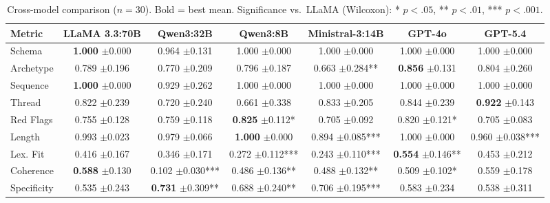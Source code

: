 \begin{table}[t]
\centering
\caption{Cross-model comparison ($n{=}30$). Bold = best mean. Significance vs.\ LLaMA (Wilcoxon): * $p{<}.05$, ** $p{<}.01$, *** $p{<}.001$.}
\label{tab:crossmodel}
\begin{tabular}{lcccccc}
\toprule
Metric & LLaMA 3.3:70B & Qwen3:32B & Qwen3:8B & Ministral-3:14B & GPT-4o & GPT-5.4 \\
\midrule
Schema & \textbf{1.000} {\scriptsize$\pm$0.000} & 0.964 {\scriptsize$\pm$0.131} & 1.000 {\scriptsize$\pm$0.000} & 1.000 {\scriptsize$\pm$0.000} & 1.000 {\scriptsize$\pm$0.000} & 1.000 {\scriptsize$\pm$0.000} \\
Archetype & 0.789 {\scriptsize$\pm$0.196} & 0.770 {\scriptsize$\pm$0.209} & 0.796 {\scriptsize$\pm$0.187} & 0.663 {\scriptsize$\pm$0.284}** & \textbf{0.856} {\scriptsize$\pm$0.131} & 0.804 {\scriptsize$\pm$0.260} \\
Sequence & \textbf{1.000} {\scriptsize$\pm$0.000} & 0.929 {\scriptsize$\pm$0.262} & 1.000 {\scriptsize$\pm$0.000} & 1.000 {\scriptsize$\pm$0.000} & 1.000 {\scriptsize$\pm$0.000} & 1.000 {\scriptsize$\pm$0.000} \\
Thread & 0.822 {\scriptsize$\pm$0.239} & 0.720 {\scriptsize$\pm$0.240} & 0.661 {\scriptsize$\pm$0.338} & 0.833 {\scriptsize$\pm$0.205} & 0.844 {\scriptsize$\pm$0.239} & \textbf{0.922} {\scriptsize$\pm$0.143} \\
Red Flags & 0.755 {\scriptsize$\pm$0.128} & 0.759 {\scriptsize$\pm$0.118} & \textbf{0.825} {\scriptsize$\pm$0.112}* & 0.705 {\scriptsize$\pm$0.092} & 0.820 {\scriptsize$\pm$0.121}* & 0.705 {\scriptsize$\pm$0.083} \\
Length & 0.993 {\scriptsize$\pm$0.023} & 0.979 {\scriptsize$\pm$0.066} & \textbf{1.000} {\scriptsize$\pm$0.000} & 0.894 {\scriptsize$\pm$0.085}*** & 1.000 {\scriptsize$\pm$0.000} & 0.960 {\scriptsize$\pm$0.038}*** \\
Lex. Fit & 0.416 {\scriptsize$\pm$0.167} & 0.346 {\scriptsize$\pm$0.171} & 0.272 {\scriptsize$\pm$0.112}*** & 0.243 {\scriptsize$\pm$0.110}*** & \textbf{0.554} {\scriptsize$\pm$0.146}** & 0.453 {\scriptsize$\pm$0.212} \\
Coherence & \textbf{0.588} {\scriptsize$\pm$0.130} & 0.102 {\scriptsize$\pm$0.030}*** & 0.486 {\scriptsize$\pm$0.136}** & 0.488 {\scriptsize$\pm$0.132}** & 0.509 {\scriptsize$\pm$0.102}* & 0.559 {\scriptsize$\pm$0.178} \\
Specificity & 0.535 {\scriptsize$\pm$0.243} & \textbf{0.731} {\scriptsize$\pm$0.309}** & 0.688 {\scriptsize$\pm$0.240}** & 0.706 {\scriptsize$\pm$0.195}*** & 0.583 {\scriptsize$\pm$0.234} & 0.538 {\scriptsize$\pm$0.311} \\

\end{tabular}
\end{table}
